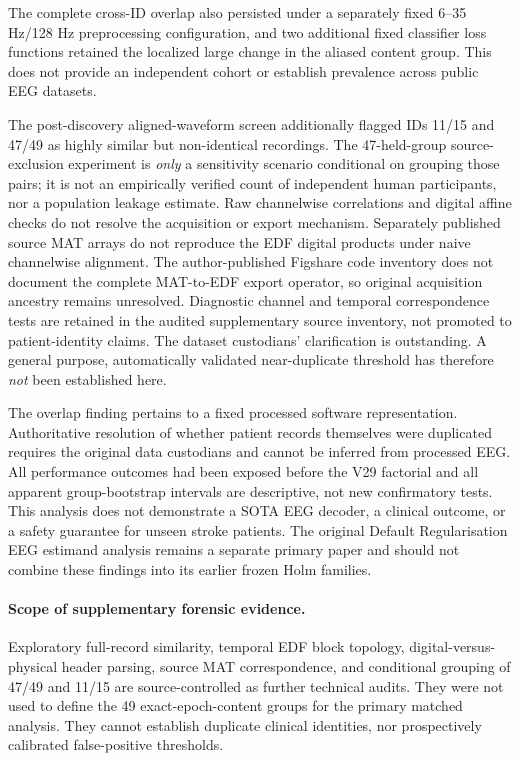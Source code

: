 \documentclass[preprint,12pt]{elsarticle}
\begin{document}
The complete cross-ID overlap also persisted under a separately fixed
6--35 Hz/128 Hz preprocessing configuration, and two additional fixed
classifier loss functions retained the localized large change in the
aliased content group. This does not provide an independent cohort or
establish prevalence across public EEG datasets.

The post-discovery aligned-waveform screen additionally flagged
IDs 11/15 and 47/49 as highly similar but non-identical
recordings. The 47-held-group source-exclusion experiment is
\emph{only} a sensitivity scenario conditional on grouping
those pairs; it is not an empirically verified count of
independent human participants, nor a population leakage
estimate. Raw channelwise correlations and digital affine
checks do not resolve the acquisition or export mechanism.
Separately published source MAT arrays do not reproduce the
EDF digital products under naive channelwise alignment. The
author-published Figshare code inventory does not document the
complete MAT-to-EDF export operator, so original acquisition
ancestry remains unresolved. Diagnostic channel and temporal
correspondence tests are retained in the audited supplementary
source inventory, not promoted to patient-identity claims.
The dataset custodians' clarification is outstanding.
A general purpose, automatically validated near-duplicate
threshold has therefore \emph{not} been established here.

The overlap finding pertains to a fixed processed software
representation. Authoritative resolution of whether patient
records themselves were duplicated requires the original
data custodians and cannot be inferred from processed EEG.
All performance outcomes had been exposed before the V29
factorial and all apparent group-bootstrap intervals are
descriptive, not new confirmatory tests. This analysis does
not demonstrate a SOTA EEG decoder, a clinical outcome, or
a safety guarantee for unseen stroke patients. The
original Default Regularisation EEG estimand analysis
remains a separate primary paper and should not combine
these findings into its earlier frozen Holm families.


\paragraph{Scope of supplementary forensic evidence.}
Exploratory full-record similarity, temporal EDF block topology,
digital-versus-physical header parsing, source MAT correspondence,
and conditional grouping of 47/49 and 11/15 are source-controlled
as further technical audits. They were not used to define the
49 exact-epoch-content groups for the primary matched analysis.
They cannot establish duplicate clinical identities, nor
prospectively calibrated false-positive thresholds.
\end{document}

